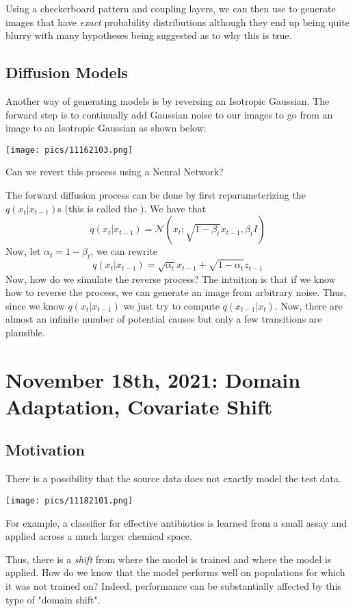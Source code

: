 \documentclass[11pt]{scrartcl}
\begin{document}
Using a checkerboard pattern and coupling layers, we can then use to generate images that have \textit{exact} probability distributions although they end up being quite blurry with many hypotheses being suggested as to why this is true. 

\subsection{Diffusion Models}
Another way of generating models is by reversing an Isotropic Gaussian. The forward step is to continually add Gaussian noise to our images to go from an image to an Isotropic Gaussian as shown below:
\begin{center}
    \texttt{[image: pics/11162103.png]}
\end{center}
Can we revert this process using a Neural Network? 

The forward diffusion process can be done by first reparameterizing the $q(x_t|x_{t-1})$s (this is called the ). We have that $$q(x_t|x_{t-1})=\mathcal{N}(x_t;\sqrt{1-\beta_t}x_{t-1},\beta_tI)$$
Now, let $\alpha_t=1-\beta_t$, we can rewrite $$q(x_t|x_{t-1})=\sqrt{\alpha_t}x_{t-1}+\sqrt{1-\alpha_t}z_{t-1}$$
Now, how do we simulate the reverse process? The intuition is that if we know how to reverse the process, we can generate an image from arbitrary noise. Thus, since we know $q(x_t|x_{t-1})$ we just try to compute $q(x_{t-1}|x_{t})$. Now, there are almost an infinite number of potential causes but only a few transitions are plausible. 

\newpage
\section{November 18th, 2021: Domain Adaptation, Covariate Shift}

\subsection{Motivation}
There is a possibility that the source data does not exactly model the test data. 
\begin{center}
    \texttt{[image: pics/11182101.png]}
\end{center}
\begin{ex}
For example, a classifier for effective antibiotics is learned from a small assay and applied across a much larger chemical space.  
\end{ex}
Thus, there is a \textit{shift} from where the model is trained and where the model is applied. How do we know that the model performs well on populations for which it was not trained on? Indeed, performance can be substantially affected by this type of "domain shift". 
\end{document}
